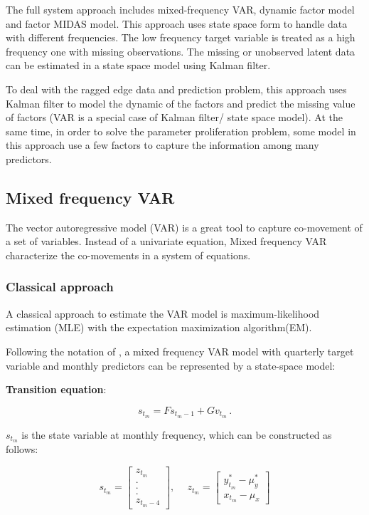 The full system approach includes mixed-frequency VAR, dynamic factor model and factor MIDAS model. This approach uses state space form to handle data with different frequencies. The low frequency target variable is treated as a high frequency one with missing observations. The missing or unobserved latent data can be estimated in a state space model using Kalman filter. 

To deal with the ragged edge data  and prediction problem, this approach uses Kalman filter to model the dynamic of the factors and predict the missing value of factors (VAR is a special case of Kalman filter/ state space model). At the same time, in order to solve the parameter proliferation problem,  some model in this approach use a few factors to capture the information among many predictors. 


\subsection{Mixed frequency VAR}

The vector autoregressive model (VAR) is a great tool to capture co-movement of a set of variables. Instead of a univariate equation, Mixed frequency VAR characterize the co-movements in a system of equations.

\subsubsection{Classical approach} 

A classical approach to estimate the VAR model is maximum-likelihood estimation (MLE) with the expectation maximization algorithm(EM). 

Following the notation of  , a mixed frequency VAR model with quarterly target variable and monthly predictors can be represented by a state-space model:


\textbf{Transition equation}:

$$s_{t_m} = F s_{t_m-1} + G v_{t_m} \, .$$

$s_{t_m}$ is the state variable at monthly frequency, which can be constructed as follows:

$$s_{t_m} = \begin{bmatrix}z_{t_m} \\ .\\.\\.\\z_{t_m-4}\end{bmatrix}, 
\ \quad z_{t_m} = \begin{bmatrix} y_{t_m}^* - \mu_y^*\\x_{t_m} - \mu_x\end{bmatrix}$$


